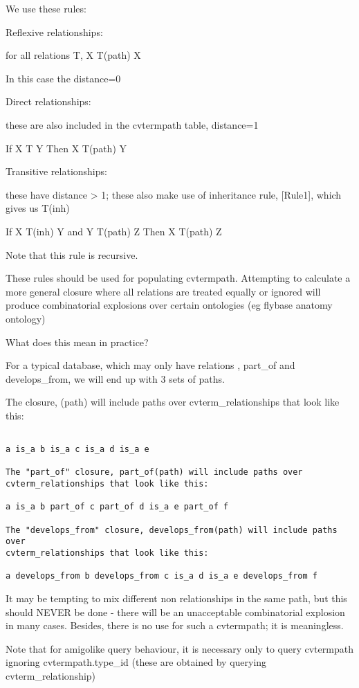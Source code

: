 We use these rules:

Reflexive relationships:

for all relations T,
  X T(path) X 

In this case the distance=0

Direct relationships:

these are also included in the cvtermpath table, distance=1

 If   X T       Y
 Then X T(path) Y

Transitive relationships:

these have distance > 1; these also make use of inheritance rule,
[Rule1], which gives us T(inh)

If   X T(inh)     Y
and  Y T(path)    Z
Then X T(path)    Z

Note that this rule is recursive.

These rules should be used for populating cvtermpath. Attempting to
calculate a more general closure where all relations are
treated equally or ignored will produce combinatorial explosions over
certain ontologies (eg flybase anatomy ontology)

What does this mean in practice?

For a typical database, which may only have relations \isa,
part\_of and develops\_from, we will end up with 3 sets of paths.

The \isa closure, \isa (path) will include paths over
cvterm\_relationships that look like this:

\begin{verbatim}

a is_a b is_a c is_a d is_a e

The "part_of" closure, part_of(path) will include paths over
cvterm_relationships that look like this:

a is_a b part_of c part_of d is_a e part_of f

The "develops_from" closure, develops_from(path) will include paths over
cvterm_relationships that look like this:

a develops_from b develops_from c is_a d is_a e develops_from f

\end{verbatim}

It may be tempting to mix different non \isa relationships in the same
path, but this should NEVER be done - there will be an unacceptable
combinatorial explosion in many cases. Besides, there is no use for
such a cvtermpath; it is meaningless.

Note that for amigolike query behaviour, it is necessary only to query
cvtermpath ignoring cvtermpath.type\_id (these are obtained by querying
cvterm\_relationship)



